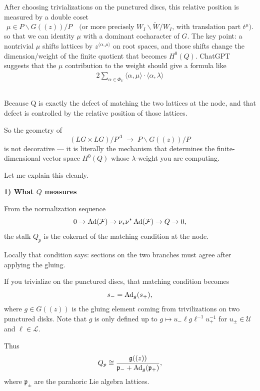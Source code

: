 \documentclass[12pt]{article}
\begin{document}
After choosing trivializations on the punctured discs, this relative position is measured by a double coset
\[
\mu \in P \backslash G((z)) / P
\quad \text{(or more precisely } W_I\backslash \widetilde{W}/ W_I\text{, with translation part } t^\mu\text{)}.
\]
so that we can identity $\mu$ with a dominant cocharacter of $G$.
The key point: a nontrivial $\mu$ shifts lattices by $z^{\langle\alpha,\mu\rangle}$ on root spaces, and those shifts change the dimension/weight of the finite quotient that becomes $H^0(Q)$. ChatGPT suggests that the $\mu$ contribution to the weight should give a formula like 
\begin{align*}
2\sum_{\alpha\in\Phi_U}\langle \alpha,\mu\rangle \cdot \langle \alpha,\lambda\rangle 
\end{align*}

\subsection{}
Because Q is exactly the defect of matching the two lattices at the node, and that defect is controlled by the relative position of those lattices.

So the geometry of
\[
(LG\times LG)/P^\Delta
\;\longrightarrow\;
P\backslash G((z))/P
\]
is not decorative — it is literally the mechanism that determines the finite-dimensional vector space $H^0(Q)$ whose $\lambda$-weight you are computing.

Let me explain this cleanly.

\medskip

\noindent\textbf{1) What $Q$ measures}

From the normalization sequence
\[
0 \to \operatorname{Ad}(\mathcal F)
\to \nu_* \nu^*\operatorname{Ad}(\mathcal F)
\to Q \to 0,
\]
the stalk $Q_p$ is the cokernel of the matching condition at the node.

Locally that condition says: sections on the two branches must agree after applying the gluing.

If you trivialize on the punctured discs, that matching condition becomes
\[
s_- = \operatorname{Ad}_g(s_+),
\]
where $g\in G((z))$ is the gluing element coming from trivilizations on two punctured disks. Note that $g$ is only defined up to $g \mapsto u_- \ell g \ell^{-1} u_+^{-1}$ for $u_\pm \in \mathcal{U}$ and $\ell \in \mathcal{L}$.

Thus
\[
Q_p
\cong
\frac{\mathfrak{g}((z))}{\mathfrak{p}_- + \operatorname{Ad}_g(\mathfrak{p}_+)},
\]
where $\mathfrak{p}_\pm$ are the parahoric Lie algebra lattices.
\end{document}
